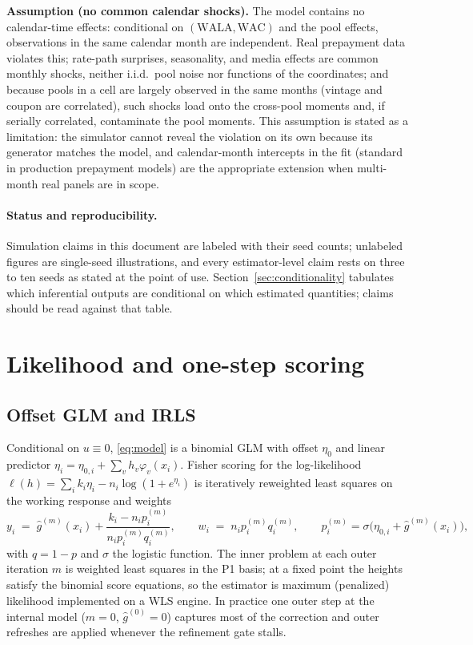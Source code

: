 \documentclass[11pt]{article}
\begin{document}
\noindent\textbf{Assumption (no common calendar shocks).} The model contains
no calendar-time effects: conditional on $(\text{WALA},\text{WAC})$ and the
pool effects, observations in the same calendar month are independent. Real
prepayment data violates this; rate-path surprises, seasonality, and media
effects are common monthly shocks, neither i.i.d.\ pool noise nor functions
of the coordinates; and because pools in a cell are largely observed in
the same months (vintage and coupon are correlated), such shocks load onto
the cross-pool moments and, if serially correlated, contaminate the pool
moments. This assumption is stated as a limitation: the simulator cannot
reveal the violation on its own because its generator matches the model, and
calendar-month intercepts in the fit (standard in production prepayment
models) are the appropriate extension when multi-month real panels are in
scope.

\paragraph{Status and reproducibility.} Simulation claims in this document
are labeled with their seed counts; unlabeled figures are single-seed
illustrations, and every estimator-level claim rests on three to ten seeds
as stated at the point of use. Section~\ref{sec:conditionality} tabulates
which inferential outputs are conditional on which estimated quantities;
claims should be read against that table.

\section{Likelihood and one-step scoring}\label{sec:glm}

\subsection{Offset GLM and IRLS}
Conditional on $u\equiv 0$, \eqref{eq:model} is a binomial GLM with offset $\eta_0$ and
linear predictor $\eta_i=\eta_{0,i}+\sum_v h_v\varphi_v(x_i)$. Fisher scoring for the
log-likelihood $\ell(h)=\sum_i k_i\eta_i-n_i\log(1+e^{\eta_i})$ is iteratively
reweighted least squares on the working response and weights
\begin{equation}\label{eq:working}
y_i \;=\; \hat g^{(m)}(x_i)+\frac{k_i-n_i p_i^{(m)}}{n_i p_i^{(m)}q_i^{(m)}},
\qquad
w_i \;=\; n_i p_i^{(m)} q_i^{(m)},
\qquad p_i^{(m)}=\sigma\!\bigl(\eta_{0,i}+\hat g^{(m)}(x_i)\bigr),
\end{equation}
with $q=1-p$ and $\sigma$ the logistic function. The inner problem at each outer
iteration $m$ is weighted least squares in the P1 basis; at a fixed point the heights
satisfy the binomial score equations, so the estimator is maximum (penalized) likelihood
implemented on a WLS engine. In practice one outer step at the internal model
($m=0$, $\hat g^{(0)}=0$) captures most of the correction and outer refreshes are
applied whenever the refinement gate stalls.
\end{document}
